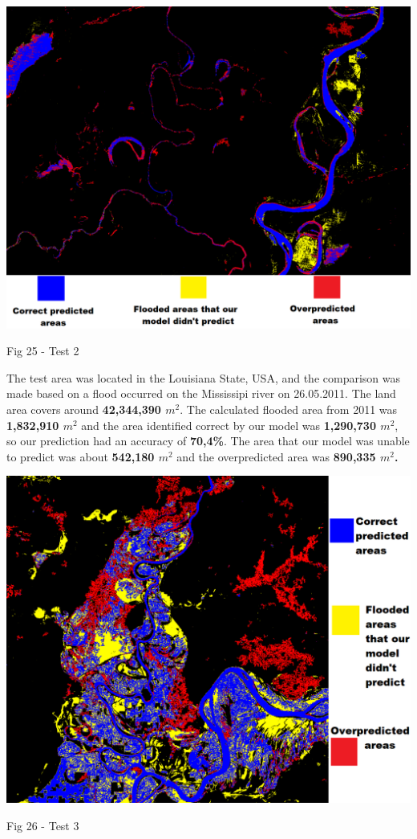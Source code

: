 \documentclass[12pt, a4paper]{report}
\begin{document}
\newpage

\bigskip
\includegraphics[scale=0.5, center]{test_2.png}
\begin{center}
Fig 25 - Test 2 
\end{center}
\par 

The test area was located in the Louisiana State, USA, and the comparison was made based on a flood occurred on the Mississipi river on 26.05.2011. The land area covers around \textbf{42,344,390 $m^2$}. The calculated flooded area from 2011 was \textbf{1,832,910 $m^2$} and the area identified correct by our model was \textbf{1,290,730 $m^2$}, so our prediction had an accuracy of \textbf{70,4\%}. The area that our model was unable to predict was about \textbf{542,180 $m^2$} and the overpredicted area was \textbf{890,335 $m^2$.}

\newpage

\bigskip
\includegraphics[scale=0.6, center]{test_3.png}
\begin{center}
Fig 26 - Test 3 
\end{center}
\par 
\end{document}
